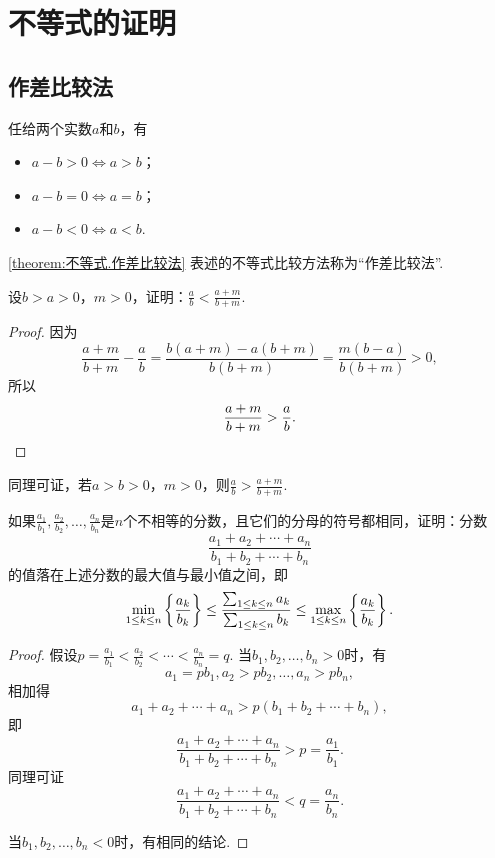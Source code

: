\section{不等式的证明}
\subsection{作差比较法}
\begin{theorem}\label{theorem:不等式.作差比较法}
任给两个实数\(a\)和\(b\)，有\begin{itemize}
	\item \(a - b > 0 \iff a > b\)；
	\item \(a - b = 0 \iff a = b\)；
	\item \(a - b < 0 \iff a < b\).
\end{itemize}
\end{theorem}
\cref{theorem:不等式.作差比较法} 表述的不等式比较方法称为“作差比较法”.

\begin{example}\label{example:不等式.真分数的分子分母同加一个正数}
设\(b > a > 0\)，\(m > 0\)，证明：\(\frac{a}{b} < \frac{a+m}{b+m}\).
\begin{proof}
因为\[
\frac{a+m}{b+m} - \frac{a}{b}
= \frac{b(a+m) - a(b+m)}{b(b+m)}
= \frac{m(b-a)}{b(b+m)} > 0,
\]所以\[
\frac{a+m}{b+m} > \frac{a}{b}.
\qedhere
\]
\end{proof}
\end{example}
同理可证，若\(a > b > 0\)，\(m > 0\)，则\(\frac{a}{b} > \frac{a+m}{b+m}\).

\begin{example}\label{example:不等式.不同浓度的溶液的混合}
如果\(\frac{a_1}{b_1},\frac{a_2}{b_2},\dotsc,\frac{a_n}{b_n}\)是\(n\)个不相等的分数，且它们的分母的符号都相同，证明：分数\[
\frac{a_1+a_2+\dotsb+a_n}{b_1+b_2+\dotsb+b_n}
\]的值落在上述分数的最大值与最小值之间，即
\begin{equation}
\def\lu{_{1 \leq k \leq n}}%
\min\lu\left\{ \frac{a_k}{b_k} \right\}
\leq
\frac{\sum\lu a_k}{\sum\lu b_k}
\leq
\max\lu\left\{ \frac{a_k}{b_k} \right\}.
\end{equation}
\begin{proof}
假设\(p=\frac{a_1}{b_1}<\frac{a_2}{b_2}<\dotsb<\frac{a_n}{b_n}=q\).
当\(b_1,b_2,\dotsc,b_n>0\)时，有\[
a_1 = p b_1,
a_2 > p b_2,
\dotsc,
a_n > p b_n,
\]相加得\[
a_1 + a_2 + \dotsb + a_n > p(b_1 + b_2 + \dotsb + b_n),
\]即\[
\frac{a_1+a_2+\dotsb+a_n}{b_1+b_2+\dotsb+b_n} > p = \frac{a_1}{b_1}.
\]同理可证\[
\frac{a_1+a_2+\dotsb+a_n}{b_1+b_2+\dotsb+b_n} < q = \frac{a_n}{b_n}.
\]

当\(b_1,b_2,\dotsc,b_n<0\)时，有相同的结论.
\end{proof}
\end{example}


